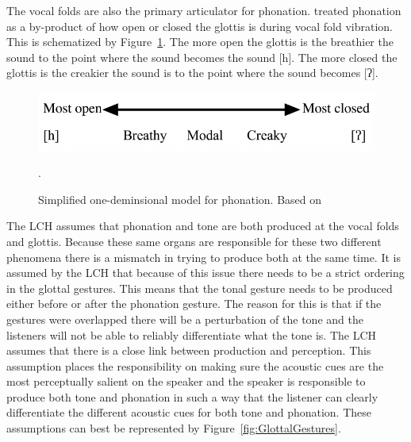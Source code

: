 \documentclass[12pt, letterpaper]{article}
\begin{document}
The vocal folds are also the primary articulator for phonation. \citet{ladefogedPreliminariesLinguisticPhonetics1971,gordonPhonationTypesCrosslinguistic2001} treated phonation as a by-product of how open or closed the glottis is during vocal fold vibration. This is schematized by Figure~\ref{fig:Phonation}. The more open the glottis is the breathier the sound to the point where the sound becomes the sound [h]. The more closed the glottis is the creakier the sound is to the point where the sound becomes [ʔ]. 
\begin{figure}[!ht]
	\centering
	\includegraphics[width=.6\textwidth]{../Phonation.png}
	\caption{Simplified one-deminsional model for phonation. Based on \citet{ladefogedPreliminariesLinguisticPhonetics1971,gordonPhonationTypesCrosslinguistic2001}}.
	\label{fig:Phonation}
\end{figure}
\vspace{-2ex}

The LCH assumes that phonation and tone are both produced at the vocal folds and glottis. Because these same organs are responsible for these two different phenomena there is a mismatch in trying to produce both at the same time. It is assumed by the LCH that because of this issue there needs to be a strict ordering in the glottal gestures. This means that the tonal gesture needs to be produced either before or after the phonation gesture. The reason for this is that if the gestures were overlapped there will be a perturbation of the tone and the listeners will not be able to reliably differentiate what the tone is. The LCH assumes that there is a close link between production and perception. This assumption places the responsibility on making sure the acoustic cues are the most perceptually salient on the speaker and the speaker is responsible to produce both tone and phonation in such a way that the listener can clearly differentiate the different acoustic cues for both tone and phonation. These assumptions can best be represented by Figure~\ref{fig:GlottalGestures}. 
\end{document}
